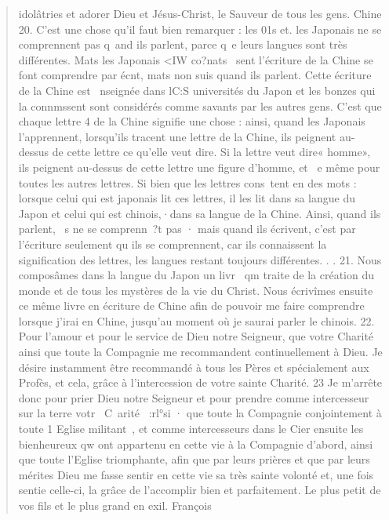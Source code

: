 \begin{quote}
    idolâtries et adorer Dieu et Jésus-Christ, le Sauveur de tous les
gens. Chine
20. C'est une chose qu'il faut bien remarquer : les 01s et.
les Japonais ne se comprennent pas q~and ils parlent, parce q~e
leurs langues sont très différentes. Mats les Japonais <IW co?nats~
sent l'écriture de la Chine se font comprendre par écnt, mats non suis
quand ils parlent. Cette écriture de la Chine est ~nseignée dans lC:S
universités du Japon et les bonzes qui la connmssent sont considérés
comme savants par les autres gens. C'est que chaque lettre 4
de la Chine signifie une chose : ainsi, quand les Japonais l'apprennent,
lorsqu'ils tracent une lettre de la Chine, ils peignent au-dessus
de cette lettre ce qu'elle veut dire. Si la lettre veut dire« homme»,
ils peignent au-dessus de cette lettre une figure d'homme, et ~e
même pour toutes les autres lettres. Si bien que les lettres cons~tent
en des mots : lorsque celui qui est japonais lit ces lettres, il
les lit dans sa langue du Japon et celui qui est chinois,·dans sa langue
de la Chine. Ainsi, quand ils parlent, ~s ne se comprenn~?t
pas · mais quand ils écrivent, c'est par l'écriture seulement qu ils
se comprennent, car ils connaissent la signification des lettres, les
langues restant toujours différentes. . .
21. Nous composâmes dans la langue du Japon un livr~ qm
traite de la création du monde et de tous les mystères de la vie du
Christ. Nous écrivîmes ensuite ce même livre en écriture de Chine
afin de pouvoir me faire comprendre lorsque j'irai en Chine,
jusqu'au moment où je saurai parler le chinois.
22. Pour l'amour et pour le service de Dieu notre Seigneur, que
votre Charité ainsi que toute la Compagnie me recommandent
continuellement à Dieu. Je désire instamment être recommandé à
tous les Pères et spécialement aux Profès, et cela, grâce à l'intercession
de votre sainte Charité.
23 Je m'arrête donc pour prier Dieu notre Seigneur et pour
prendre comme intercesseur sur la terre votr~ C~arité~ :rl°si · que
toute la Compagnie conjointement à toute 1 Eglise militant~, et
comme intercesseurs dans le Cier ensuite les bienheureux qw ont
appartenu en cette vie à la Compagnie d'abord, ainsi que toute
l'Eglise triomphante, afin que par leurs prières et que par leurs
mérites Dieu me fasse sentir en cette vie sa très sainte volonté et,
une fois sentie celle-ci, la grâce de l'accomplir bien et parfaitement.
Le plus petit de vos fils et le plus grand en exil.
François
\end{quote}